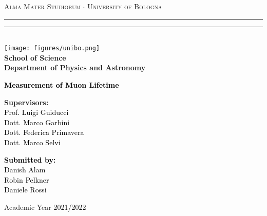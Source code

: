 
\setlength\parindent{0pt}

\begin{titlepage}
  \begin{center}
  {{\Large{\textsc{Alma Mater Studiorum $\cdot$ University of  Bologna}}}} 
  \rule[0.1cm]{10cm}{0.1mm}
  \rule[0.5cm]{10cm}{0.6mm}
  \\\vspace{3mm}
  \texttt{[image: figures/unibo.png]}
  \\ \vspace{3mm}
  {\small{\textbf{School of Science\\
  Department of Physics and Astronomy}}}
  \end{center}
  
  \vspace{23mm}
  
  \begin{center}\textcolor{black}{
  {\LARGE{\textbf{Measurement of Muon Lifetime}}}\\
  }\end{center}
  
  \vspace{50mm} \par \noindent
  
  \begin{minipage}[t]{0.47\textwidth}
  {\large{\textbf{Supervisors: }\vspace{2mm}\\\textcolor{black}{
    Prof. Luigi Guiducci \\
    Dott. Marco Garbini \\
    Dott. Federica Primavera\\
    Dott. Marco Selvi}}}
  \end{minipage}
  \hfill
  \begin{minipage}[t]{0.47\textwidth}\raggedleft \textcolor{black}{
  {\large{\textbf{Submitted by:}
  \vspace{2mm}\\
  \textcolor{black}{
Danish Alam\\
Robin Pelkner\\
Daniele Rossi}}}
  }
  \end{minipage}
  \vspace{2mm}
  \begin{center}
  Academic Year \textcolor{black}{2021/2022}
  \end{center}
  
  \end{titlepage}



\thispagestyle{empty}

\newpage
\tableofcontents
\newpage
{}
\pagestyle{headings}








\newpage
\printbibliography
\appendix


